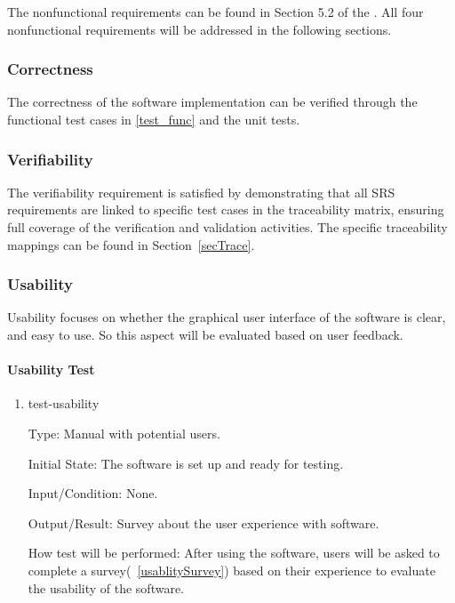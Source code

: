 \documentclass[12pt, titlepage]{article}
\begin{document}
The nonfunctional requirements can be found in Section 5.2 of the \citet{SRS}. 
All four nonfunctional requirements will be addressed in the following sections.

\subsubsection{Correctness} \label{correctTest}

The correctness of the software implementation can be verified through the 
functional test cases in \ref{test_func} and the unit tests.

\subsubsection{Verifiability} \label{verifyTest}

The verifiability requirement is satisfied by demonstrating that all SRS 
requirements are linked to specific test cases in the traceability matrix, 
ensuring full coverage of the verification and validation activities. The 
specific traceability mappings can be found in Section~\ref{secTrace}.

\subsubsection{Usability} \label{usabilityTest}

Usability focuses on whether the graphical user interface of the software is 
clear, and easy to use. So this aspect will be evaluated based on user feedback.
		
\paragraph{Usability Test}

\begin{enumerate}

\item{test-usability\\}

Type: Manual with potential users.
					
Initial State: The software is set up and ready for testing.
					
Input/Condition: None.
					
Output/Result: Survey about the user experience with software.
					
How test will be performed: After using the software, users will be asked to 
complete a survey(~\ref{usablitySurvey}) based on their experience to 
evaluate the usability of the software.

\end{enumerate}
\end{document}
